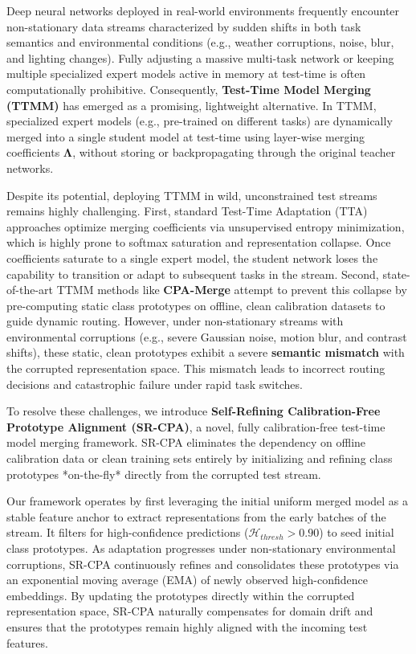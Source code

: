 \documentclass{article}
\theoremstyle{plain}
\theoremstyle{definition}
\theoremstyle{remark}
\begin{document}
Deep neural networks deployed in real-world environments frequently encounter non-stationary data streams characterized by sudden shifts in both task semantics and environmental conditions (e.g., weather corruptions, noise, blur, and lighting changes). Fully adjusting a massive multi-task network or keeping multiple specialized expert models active in memory at test-time is often computationally prohibitive. Consequently, \textbf{Test-Time Model Merging (TTMM)} \cite{cpamerge2025, lfwa2025} has emerged as a promising, lightweight alternative. In TTMM, specialized expert models (e.g., pre-trained on different tasks) are dynamically merged into a single student model at test-time using layer-wise merging coefficients $\boldsymbol{\Lambda}$, without storing or backpropagating through the original teacher networks.

Despite its potential, deploying TTMM in wild, unconstrained test streams remains highly challenging. First, standard Test-Time Adaptation (TTA) approaches \cite{wang2020tent, niu2023towards} optimize merging coefficients via unsupervised entropy minimization, which is highly prone to softmax saturation and representation collapse. Once coefficients saturate to a single expert model, the student network loses the capability to transition or adapt to subsequent tasks in the stream. Second, state-of-the-art TTMM methods like \textbf{CPA-Merge} \cite{cpamerge2025} attempt to prevent this collapse by pre-computing static class prototypes on offline, clean calibration datasets to guide dynamic routing. However, under non-stationary streams with environmental corruptions (e.g., severe Gaussian noise, motion blur, and contrast shifts), these static, clean prototypes exhibit a severe \textbf{semantic mismatch} with the corrupted representation space. This mismatch leads to incorrect routing decisions and catastrophic failure under rapid task switches.

To resolve these challenges, we introduce \textbf{Self-Refining Calibration-Free Prototype Alignment (SR-CPA)}, a novel, fully calibration-free test-time model merging framework. SR-CPA eliminates the dependency on offline calibration data or clean training sets entirely by initializing and refining class prototypes *on-the-fly* directly from the corrupted test stream. 

Our framework operates by first leveraging the initial uniform merged model as a stable feature anchor to extract representations from the early batches of the stream. It filters for high-confidence predictions ($\mathcal{H}_{thresh} > 0.90$) to seed initial class prototypes. As adaptation progresses under non-stationary environmental corruptions, SR-CPA continuously refines and consolidates these prototypes via an exponential moving average (EMA) of newly observed high-confidence embeddings. By updating the prototypes directly within the corrupted representation space, SR-CPA naturally compensates for domain drift and ensures that the prototypes remain highly aligned with the incoming test features.
\end{document}
